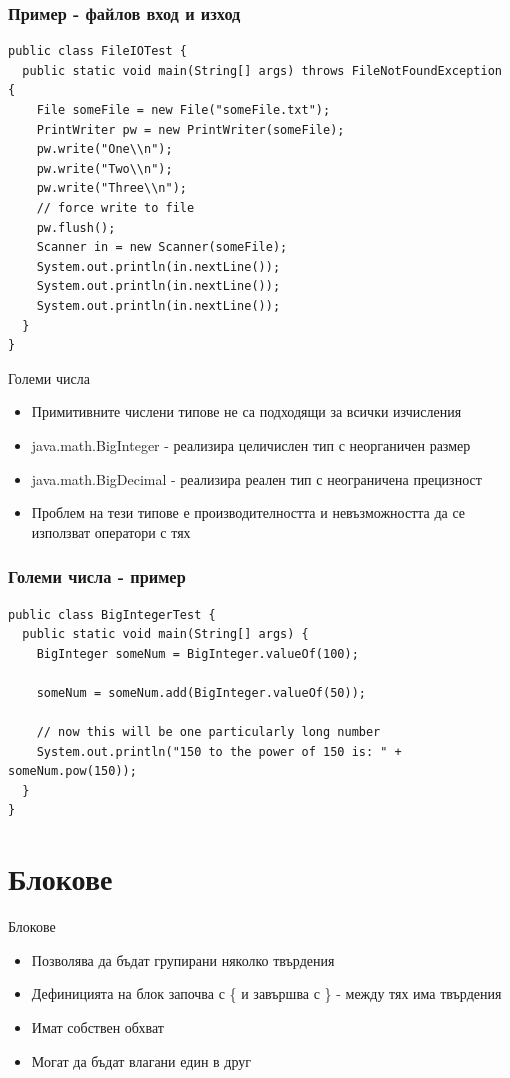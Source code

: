 \documentclass{beamer}
\begin{document}
\begin{frame}[fragile]
  \frametitle{Пример - файлов вход и изход}
  \transdissolve
\begin{lstlisting}
public class FileIOTest {
  public static void main(String[] args) throws FileNotFoundException {
    File someFile = new File("someFile.txt");
    PrintWriter pw = new PrintWriter(someFile);
    pw.write("One\\n");
    pw.write("Two\\n");
    pw.write("Three\\n");
    // force write to file
    pw.flush();
    Scanner in = new Scanner(someFile);
    System.out.println(in.nextLine());
    System.out.println(in.nextLine());
    System.out.println(in.nextLine());
  }
}  
\end{lstlisting}
\end{frame}

\begin{frame}{Големи числа}
  \transdissolve
  \begin{itemize}
  \item Примитивните числени типове не са подходящи за всички
    изчисления \pause
  \item java.math.BigInteger - реализира целичислен тип с неорганичен
    размер \pause
  \item java.math.BigDecimal - реализира реален тип с неограничена
    прецизност \pause
  \item Проблем на тези типове е производителността и невъзможността
    да се използват оператори с тях
  \end{itemize}
\end{frame}

\begin{frame}[fragile]
  \frametitle{Големи числа - пример}
  \transdissolve
\begin{lstlisting}
public class BigIntegerTest {
  public static void main(String[] args) {
    BigInteger someNum = BigInteger.valueOf(100);

    someNum = someNum.add(BigInteger.valueOf(50));

    // now this will be one particularly long number
    System.out.println("150 to the power of 150 is: " + someNum.pow(150));
  }
}  
\end{lstlisting}
\end{frame}

\section{Блокове}
\begin{frame}{Блокове}
  \transdissolve
  \begin{itemize}
  \item Позволява да бъдат групирани няколко
    твърдения \pause
   \item Дефиницията на блок започва с \{ и
      завършва с \} - между тях има
    твърдения \pause
   \item Имат собствен обхват \pause
   \item Могат да бъдат влагани един в друг
  \end{itemize}
\end{frame}
\end{document}
